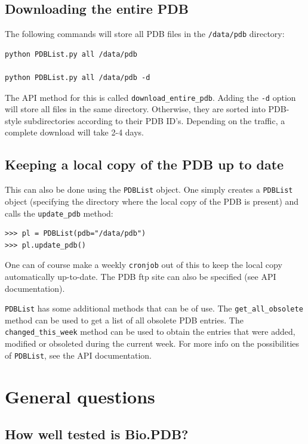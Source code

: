 \subsection{Downloading the entire PDB}

The following commands will store all PDB files in the \texttt{/data/pdb}
directory:

\begin{verbatim}
python PDBList.py all /data/pdb

python PDBList.py all /data/pdb -d
\end{verbatim}
\noindent The API method for this is called \texttt{download\_entire\_pdb}.
Adding the \texttt{-d} option will store all files in the same directory.
Otherwise, they are sorted into PDB-style subdirectories according
to their PDB ID's. Depending on the traffic, a complete download will
take 2-4 days.

\subsection{Keeping a local copy of the PDB up to date}

This can also be done using the \texttt{PDBList} object. One simply
creates a \texttt{PDBList} object (specifying the directory where
the local copy of the PDB is present) and calls the \texttt{update\_pdb}
method:

\begin{verbatim}
>>> pl = PDBList(pdb="/data/pdb")
>>> pl.update_pdb()
\end{verbatim}
One can of course make a weekly \texttt{cronjob} out of this to keep
the local copy automatically up-to-date. The PDB ftp site can also
be specified (see API documentation).

\texttt{PDBList} has some additional methods that can be of use. The
\texttt{get\_all\_obsolete} method can be used to get a list of all
obsolete PDB entries. The \texttt{changed\_this\_week} method can
be used to obtain the entries that were added, modified or obsoleted
during the current week. For more info on the possibilities of \texttt{PDBList},
see the API documentation.

\section{General questions}

\subsection{How well tested is Bio.PDB?}

